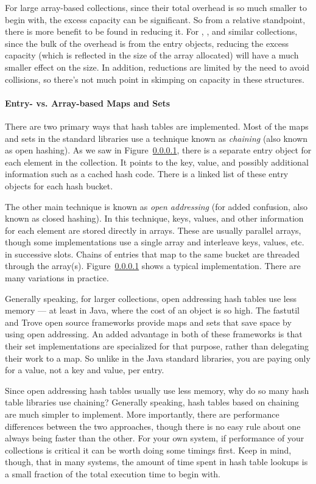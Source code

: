 For large array-based collections, since their total overhead is
so much smaller to begin with, the excess capacity can be significant. So from a
relative standpoint, there is more benefit to be found in reducing it.  For
, , and similar collections, since the bulk of the overhead is from the entry objects, reducing the excess capacity (which is
reflected in the size of the array allocated) will have a much smaller effect on
the size.  In addition, reductions are limited by the need to avoid
collisions, so there's not much point in skimping on capacity in these
structures.


\paragraph{Entry- vs. Array-based Maps and Sets}

There are two primary ways that hash tables are implemented. Most of the maps and sets
in the standard libraries use a technique known as \emph{chaining} (also
known as open hashing).  As we saw in Figure~\ref{}, there is a separate entry
object for each element in the collection.  It points to the key, value, and
possibly additional information such as a cached hash code. There is a linked
list of these entry objects for each hash bucket.

The other main technique is known as \emph{open addressing} (for added
confusion, also known as closed hashing).  In this technique,
keys, values, and other information for each element are stored directly in
arrays. These are usually parallel arrays, though some implementations
use a single array and interleave keys, values, etc. in successive slots. Chains
of entries that map to the same bucket are threaded through the array(s).
Figure~\ref{} shows a typical implementation. There are many variations in
practice.

Generally speaking, for larger collections, open addressing hash tables use less
memory --- at least in Java, where the cost of an object is so high. The fastutil and Trove open source
frameworks provide maps and sets that save space by using open addressing. An added
advantage in both of these frameworks is that their set implementations are specialized for
that purpose, rather than delegating their work to a map. So unlike in the Java standard libraries,
you are paying only for a value, not a key and value, per entry. 

Since open addressing hash tables usually use less memory, why do so many hash
table libraries use chaining? Generally speaking, hash tables based
on chaining are much simpler to implement. More importantly, there
are performance differences between the two approaches, though there is no easy
rule about one always being faster than the other. For your
own system, if performance of your collections is critical it can be worth doing
some timings first.  Keep in mind, though, that in many systems, the amount of time spent in
hash table lookups is a small fraction of the total execution time to begin with. 

